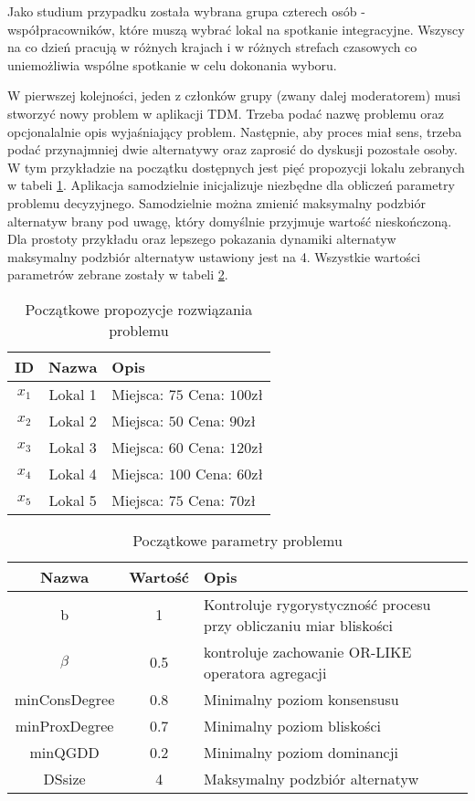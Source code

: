 Jako studium przypadku została wybrana grupa czterech osób - współpracowników,
które muszą wybrać lokal na spotkanie integracyjne. Wszyscy na co dzień
pracują w różnych krajach i w różnych strefach czasowych co uniemożliwia wspólne
spotkanie w celu dokonania wyboru.

W pierwszej kolejności, jeden z członków grupy (zwany dalej moderatorem) musi
stworzyć nowy problem w aplikacji TDM. Trzeba podać nazwę problemu oraz
opcjonalalnie opis wyjaśniający problem. Następnie, aby proces miał sens, trzeba
podać przynajmniej dwie alternatywy oraz zaprosić do dyskusji pozostałe osoby. W
tym przykładzie na początku dostępnych jest pięć propozycji lokalu zebranych w
tabeli \ref{tab:init_ideas}.
Aplikacja samodzielnie inicjalizuje niezbędne dla obliczeń parametry problemu
decyzyjnego. Samodzielnie można zmienić maksymalny podzbiór alternatyw brany pod
uwagę, który domyślnie przyjmuje wartość nieskończoną. Dla prostoty przykładu
oraz lepszego pokazania dynamiki alternatyw maksymalny podzbiór alternatyw
ustawiony jest na 4. Wszystkie wartości parametrów zebrane zostały w tabeli
\ref{tab:init_problem_params}.

\begin{table}[ht]
\caption{Początkowe propozycje rozwiązania problemu}
\begin{tabularx}{\textwidth}{|c|c|X|}
\hline
ID & Nazwa & Opis \\
\hline
$x_1$ & Lokal 1 & Miejsca: $75$ Cena: $100\textrm{zł}$ \\
\hline
$x_2$ & Lokal 2 & Miejsca: $50$ Cena: $90\textrm{zł}$ \\
\hline
$x_3$ & Lokal 3 & Miejsca: $60$ Cena: $120\textrm{zł}$ \\
\hline
$x_4$ & Lokal 4 & Miejsca: $100$ Cena: $60\textrm{zł}$ \\
\hline
$x_5$ & Lokal 5 & Miejsca: $75$ Cena: $70\textrm{zł}$ \\
\hline
\end{tabularx}
\label{tab:init_ideas}
\end{table}

\begin{table}[ht]
\caption{Początkowe parametry problemu}
\begin{tabularx}{\textwidth}{|c|c|X|}
\hline
Nazwa & Wartość & Opis \\
\hline
b & 1 & Kontroluje rygorystyczność procesu przy obliczaniu miar bliskości \\
\hline
$\beta$ & 0.5 & kontroluje zachowanie OR-LIKE operatora agregacji \\
\hline
minConsDegree & 0.8 & Minimalny poziom konsensusu \\
\hline
minProxDegree & 0.7 & Minimalny poziom bliskości \\
\hline
minQGDD & 0.2 & Minimalny poziom dominancji \\
\hline
DSsize & 4 & Maksymalny podzbiór alternatyw \\
\hline
\end{tabularx}
\label{tab:init_problem_params}
\end{table}

